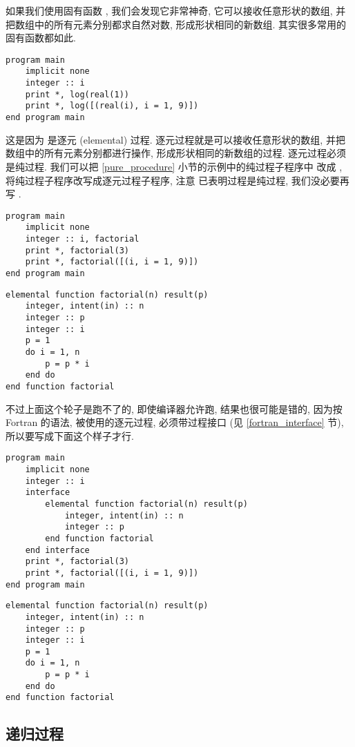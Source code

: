 如果我们使用固有函数 , 我们会发现它非常神奇, 它可以接收任意形状的数组, 并把数组中的所有元素分别都求自然对数, 形成形状相同的新数组. 其实很多常用的固有函数都如此.
\begin{lstlisting}
program main
    implicit none
    integer :: i
    print *, log(real(1))
    print *, log([(real(i), i = 1, 9)])
end program main
\end{lstlisting}
这是因为  是逐元 (elemental) 过程. 逐元过程就是可以接收任意形状的数组, 并把数组中的所有元素分别都进行操作, 形成形状相同的新数组的过程. 逐元过程必须是纯过程. 我们可以把 \ref{pure_procedure} 小节的示例中的纯过程子程序中  改成 , 将纯过程子程序改写成逐元过程子程序, 注意  已表明过程是纯过程, 我们没必要再写 .
\begin{lstlisting}
program main
    implicit none
    integer :: i, factorial
    print *, factorial(3)
    print *, factorial([(i, i = 1, 9)])
end program main
\end{lstlisting}
\begin{lstlisting}
elemental function factorial(n) result(p)
    integer, intent(in) :: n
    integer :: p
    integer :: i 
    p = 1
    do i = 1, n
        p = p * i
    end do
end function factorial
\end{lstlisting}
不过上面这个轮子是跑不了的, 即使编译器允许跑, 结果也很可能是错的, 因为按 Fortran 的语法, 被使用的逐元过程, 必须带过程接口 (见 \ref{fortran_interface} 节), 所以要写成下面这个样子才行.\label{elemental_procedure_program} 
\begin{lstlisting}
program main
    implicit none
    integer :: i
    interface
        elemental function factorial(n) result(p)
            integer, intent(in) :: n
            integer :: p
        end function factorial
    end interface
    print *, factorial(3)
    print *, factorial([(i, i = 1, 9)])
end program main
\end{lstlisting}
\begin{lstlisting}
elemental function factorial(n) result(p)
    integer, intent(in) :: n
    integer :: p
    integer :: i 
    p = 1
    do i = 1, n
        p = p * i
    end do
end function factorial
\end{lstlisting}

\subsection{递归过程}

